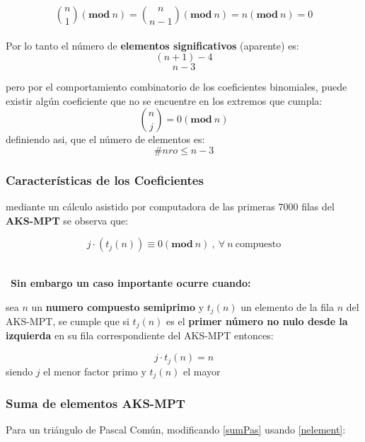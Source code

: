 \documentclass[a4paper, 12pt]{article}
\begin{document}
\begin{equation}\label{nelement}
\binom{n}{1}(\mathbf{mod}\ n) = \binom{n}{n-1}(\mathbf{mod}\ n) = n(\mathbf{mod}\ n) = 0
\end{equation}
\ \\
Por lo tanto el número de \textbf{elementos significativos} (aparente) es:
\[(n + 1) - 4\]
\[n - 3\]

pero por el comportamiento combinatorio de los coeficientes binomiales, puede existir algún coeficiente que no se encuentre en los extremos que cumpla:
\[ \binom{n}{j} = 0 (\mathbf{mod}\ n) \]
definiendo asi, que el número de elementos es:
\begin{equation}\label{elements}
		\#nro \leq n - 3
\end{equation}

\subsubsection{Características de los Coeficientes}

mediante un cálculo asistido por computadora de las primeras $7000$ filas del \textbf{AKS-MPT} se observa que:

\begin{equation}\label{composite}
j\cdotp(t_{j}(n)) \equiv 0 (\mathbf{mod}\ n) \ ,\  \forall \ n \ \text{compuesto}
\end{equation}


\ \\
\
\textbf{Sin embargo un caso importante ocurre cuando:}

\begin{center}
	sea $n$ un \textbf{numero compuesto semiprimo} y $t_{j}(n)$ un elemento de la fila $n$ del AKS-MPT, se cumple que si $t_{j}(n)$ es el \textbf{primer número no nulo desde la izquierda} en su fila correspondiente del AKS-MPT entonces:
	
	\begin{equation}\label{semiprimes}
	j\cdotp t_{j}(n) = n 
	\end{equation}
siendo $j$ el menor factor primo y $t_{j}(n)$ el mayor
\end{center}


\subsubsection{Suma de elementos AKS-MPT}

 Para un triángulo de Pascal Común, modificando \ref{sumPas} usando \ref{nelement}:
	
\end{document}
